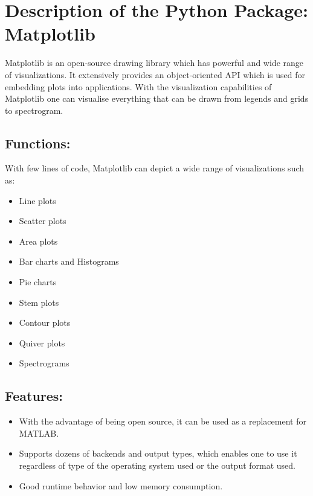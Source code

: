 %
%



\chapter{Description of the Python Package: Matplotlib}

Matplotlib is an open-source drawing library which has powerful and wide range of visualizations. It extensively provides an object-oriented API which is used for embedding plots into applications. With the visualization capabilities of Matplotlib one can visualise everything that can be drawn from legends and grids to spectrogram. 

\section{Functions:}

With few lines of code, Matplotlib can depict a wide range of visualizations such as:
\begin{itemize}
    \item Line plots
    \item Scatter plots
    \item Area plots
    \item Bar charts and Histograms
    \item Pie charts
    \item Stem plots
    \item Contour plots
    \item Quiver plots
    \item Spectrograms
\end{itemize}

\section{Features:}

\begin{itemize}
    \item With the advantage of being open source, it can be used as a replacement for MATLAB.
    \item Supports dozens of backends and output types, which enables one to use it regardless of type of the operating system used or the output format used.
    \item Good runtime behavior and low memory consumption.
\end{itemize}

